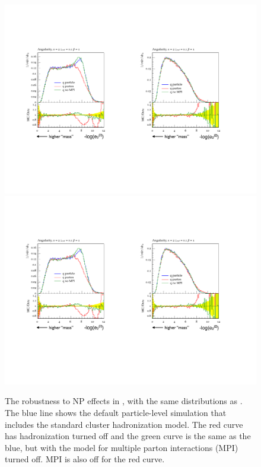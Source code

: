 \begin{figure}[t]
\begin{center}
\includegraphics[width = 0.48\columnwidth]{figures/robustness2a.pdf}\includegraphics[width = 0.49\columnwidth]{figures/robustness2b.pdf}
\end{center}
\caption{The robustness to NP effects in \herwig, with the same distributions as .
%
The blue line shows the default particle-level simulation that includes the standard cluster hadronization model.
%
The red curve has hadronization turned off and the green curve is the same as the blue, but with the \herwig model for multiple parton interactions (MPI) turned off.
%
MPI is also off for the red curve.}
\label{fig:robustness}
\end{figure}

